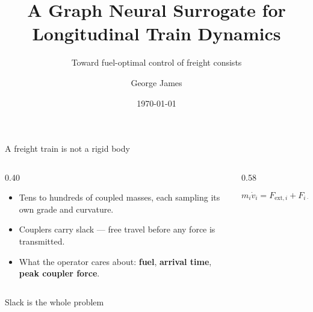\documentclass[aspectratio=169,11pt]{beamer}
\title{A Graph Neural Surrogate for Longitudinal Train Dynamics}
\subtitle{Toward fuel-optimal control of freight consists}
\author{George James}
\institute{School of Engineering, Colorado State University Pueblo}
\date{\today}
\begin{document}
\maketitle

\begin{frame}{A freight train is not a rigid body}
  \begin{columns}[T,onlytextwidth]
    \begin{column}{0.40\textwidth}
      \begin{itemize}\setlength\itemsep{0.7em}
        \item Tens to hundreds of coupled masses, each sampling its
              \alert{own} grade and curvature.
        \item Couplers carry \alert{slack} --- free travel before any
              force is transmitted.
        \item What the operator cares about: \textbf{fuel},
              \textbf{arrival time}, \textbf{peak coupler force}.
      \end{itemize}
    \end{column}
    \begin{column}{0.58\textwidth}
      \centering
      \vspace{0.3em}
      \scalebox{0.72}{\trainFBD}

      \vspace{1.6em}
      \[ m_i\dot v_i = F_{\mathrm{ext},i} + F_{i-1} - F_i \]
    \end{column}
  \end{columns}
\end{frame}

\begin{frame}{Slack is the whole problem}
  \centering
  \vspace{-0.3em}

  \vspace{0.2em}
\end{frame}
\end{document}

